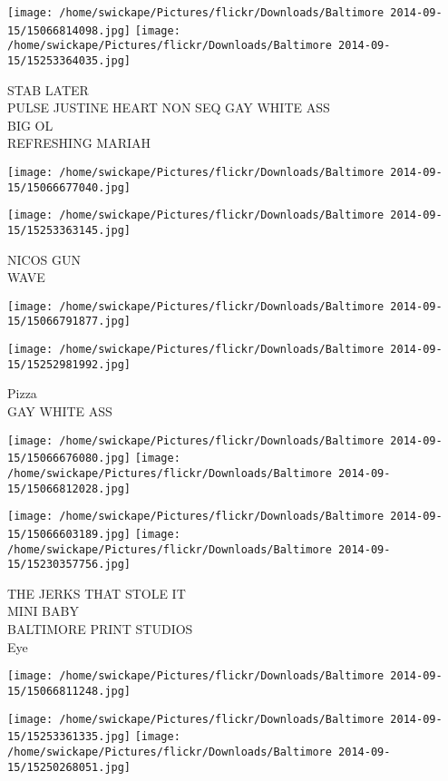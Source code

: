 \documentclass[10pt,letterpaper]{article}
\begin{document}
\texttt{[image: /home/swickape/Pictures/flickr/Downloads/Baltimore 2014-09-15/15066814098.jpg]}
\texttt{[image: /home/swickape/Pictures/flickr/Downloads/Baltimore 2014-09-15/15253364035.jpg]}

STAB LATER\\
PULSE JUSTINE HEART NON SEQ GAY WHITE ASS\\
BIG OL\\
REFRESHING MARIAH
\pagebreak

\texttt{[image: /home/swickape/Pictures/flickr/Downloads/Baltimore 2014-09-15/15066677040.jpg]}

\vspace{0.25in}
\texttt{[image: /home/swickape/Pictures/flickr/Downloads/Baltimore 2014-09-15/15253363145.jpg]}

NICOS GUN\\
WAVE
\pagebreak

\texttt{[image: /home/swickape/Pictures/flickr/Downloads/Baltimore 2014-09-15/15066791877.jpg]}

\vspace{0.25in}
\texttt{[image: /home/swickape/Pictures/flickr/Downloads/Baltimore 2014-09-15/15252981992.jpg]}

Pizza\\
GAY WHITE ASS
\pagebreak

\texttt{[image: /home/swickape/Pictures/flickr/Downloads/Baltimore 2014-09-15/15066676080.jpg]}
\texttt{[image: /home/swickape/Pictures/flickr/Downloads/Baltimore 2014-09-15/15066812028.jpg]}

\texttt{[image: /home/swickape/Pictures/flickr/Downloads/Baltimore 2014-09-15/15066603189.jpg]}
\texttt{[image: /home/swickape/Pictures/flickr/Downloads/Baltimore 2014-09-15/15230357756.jpg]}

THE JERKS THAT STOLE IT\\
MINI BABY\\
BALTIMORE PRINT STUDIOS\\
Eye
\pagebreak

\texttt{[image: /home/swickape/Pictures/flickr/Downloads/Baltimore 2014-09-15/15066811248.jpg]}

\vspace{0.25in}
\texttt{[image: /home/swickape/Pictures/flickr/Downloads/Baltimore 2014-09-15/15253361335.jpg]}
\texttt{[image: /home/swickape/Pictures/flickr/Downloads/Baltimore 2014-09-15/15250268051.jpg]}
\end{document}
